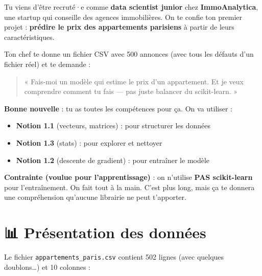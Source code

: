 \documentclass[
  french,
  11pt,
  a4paper,
]{scrbook}
\providecommand{\tightlist}{%
  \setlength{\itemsep}{0pt}\setlength{\parskip}{0pt}}
\begin{document}
Tu viens d'être recruté·e comme \textbf{data scientist junior} chez
\textbf{ImmoAnalytica}, une startup qui conseille des agences
immobilières. On te confie ton premier projet : \textbf{prédire le prix
des appartements parisiens} à partir de leurs caractéristiques.

Ton chef te donne un fichier CSV avec 500 annonces (avec tous les
défauts d'un fichier réel) et te demande :

\begin{quote}
« Fais-moi un modèle qui estime le prix d'un appartement. Et je veux
comprendre comment tu fais --- pas juste balancer du scikit-learn. »
\end{quote}

\textbf{Bonne nouvelle} : tu as toutes les compétences pour ça. On va
utiliser :

\begin{itemize}
\tightlist
\item
  \textbf{Notion 1.1} (vecteurs, matrices) : pour structurer les données
\item
  \textbf{Notion 1.3} (stats) : pour explorer et nettoyer
\item
  \textbf{Notion 1.2} (descente de gradient) : pour entraîner le modèle
\end{itemize}

\textbf{Contrainte (voulue pour l'apprentissage)} : on n'utilise
\textbf{PAS scikit-learn} pour l'entraînement. On fait tout à la main.
C'est plus long, mais ça te donnera une compréhension qu'aucune
librairie ne peut t'apporter.

\chapter{📊 Présentation des
données}\label{pruxe9sentation-des-donnuxe9es}

Le fichier \texttt{appartements\_paris.csv} contient 502 lignes (avec
quelques doublons\ldots) et 10 colonnes :
\end{document}
